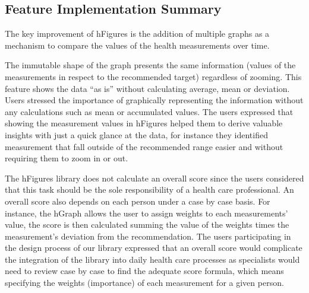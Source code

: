 \documentclass[twocolumn]{bmcart}%
\begin{document}



\subsection*{Feature Implementation Summary}

The key improvement of hFigures is the addition of multiple graphs as a mechanism to compare the values of the health measurements over time.

The immutable shape of the graph presents the same information (values of the measurements in respect to the recommended target) regardless of zooming. This feature shows the data ``as is'' without calculating average, mean or deviation. Users stressed the importance of graphically representing the information without any calculations such as mean or accumulated values. The users expressed that showing the measurement values in hFigures helped them to derive valuable insights with just a quick glance at the data, for instance they identified measurement that fall outside of the recommended range easier and without requiring them to zoom in or out.

The hFigures library does not calculate an overall score since the users considered that this task should be the sole responsibility of a health care professional. An overall score also depends on each person under a case by case basis. For instance, the hGraph allows the user to assign weights to each measurements' value, the score is then calculated summing the value of the weights times the measurement's deviation from the recommendation. The users participating in the design process of our library expressed that an overall score would complicate the integration of the library into daily health care processes as specialists would need to review case by case to find the adequate score formula, which means specifying the weights (importance) of each measurement for a given person.
\end{document}
